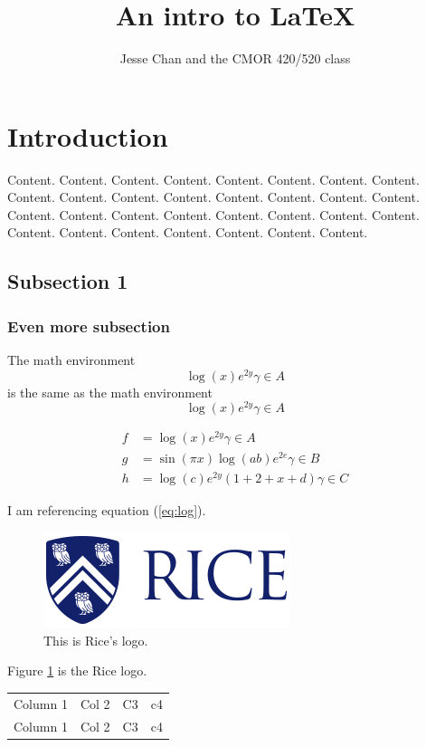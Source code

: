 \documentclass{article}
\title{An intro to \LaTeX}
\author{Jesse Chan and the CMOR 420/520 class}
\date{}
\begin{document}
\maketitle

\section{Introduction}
Content. Content. Content. Content. Content. Content. Content. Content. Content. Content. Content. Content. Content. Content. Content. Content. Content. Content. Content. Content. Content. Content. Content. Content. Content. Content. Content. Content. Content. Content. Content.

\subsection{Subsection 1}

\subsubsection{Even more subsection}

The math environment 
$$\log(x)e^{2y} \gamma \in A$$
is the same as the math environment
\[
\log(x)e^{2y} \gamma \in A
\]

\begin{align}
  f &= \log(x)e^{2y} \gamma \in A  \label{eq:log} \\
  g &= \sin(\pi x)\log(ab)e^{2e} \gamma \in B  \\
  h &= \log(c)e^{2y} (1 + 2 + x + d) \gamma \in C    
\end{align}


I am referencing equation (\ref{eq:log}). \lipsum

\begin{figure}
  \centering
  \includegraphics[width=.4\textwidth]{image.png}
  \caption{This is Rice's logo.}
  \label{fig:rice}
\end{figure}

Figure \ref{fig:rice} is the Rice logo.

\begin{table}
  \centering
  \begin{tabular}{|c|ccc|}
    Column 1 & Col 2 & C3 & c4 \\
    Column 1 & Col 2 & C3 & c4
  \end{tabular}
\end{table}
\end{document}
